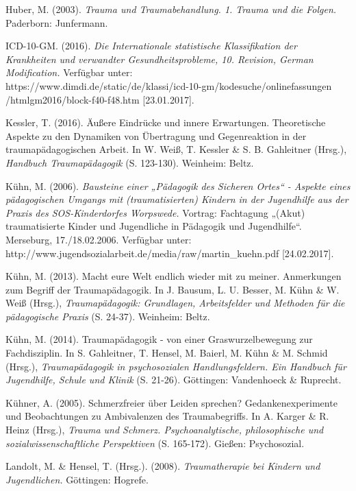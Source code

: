 \hang
Huber, M. (2003). \textit{Trauma und Traumabehandlung. 1. Trauma und die Folgen.} Paderborn: Junfermann.

\hang
ICD-10-GM. (2016). \textit{Die Internationale statistische Klassifikation der Krankheiten und verwandter Gesundheitsprobleme, 10. Revision, German Modification.} Verfügbar unter:\\ https://www.dimdi.de/static/de/klassi/icd-10-gm/kodesuche/onlinefassungen\\
/htmlgm2016/block-f40-f48.htm [23.01.2017].

\hang
Kessler, T. (2016). {\"A}ußere Eindr{\"u}cke und innere Erwartungen. Theoretische Aspekte zu den Dynamiken von {\"U}bertragung und Gegenreaktion in der traumap{\"a}dagogischen Arbeit. In W. Weiß, T. Kessler \& S. B. Gahleitner (Hrsg.), \textit{Handbuch Traumapädagogik} (S. 123-130). Weinheim: Beltz.

\hang
Kühn, M. (2006). \textit{Bausteine einer „P{\"a}dagogik des Sicheren Ortes“ - Aspekte eines p{\"a}dagogischen Umgangs mit (traumatisierten) Kindern in der Jugendhilfe aus der Praxis des SOS-Kinderdorfes Worpswede.} Vortrag: Fachtagung „(Akut) traumatisierte Kinder und Jugendliche in P{\"a}dagogik und Jugendhilfe“. Merseburg, 17./18.02.2006. Verfügbar unter:\\ http://www.jugendsozialarbeit.de/media/raw/martin\_kuehn.pdf [24.02.2017].

\hang
Kühn, M. (2013). Macht eure Welt endlich wieder mit zu meiner. Anmerkungen zum Begriff der Traumapädagogik. In J. Bausum, L. U. Besser, M. Kühn \& W. Weiß (Hrsg.), \textit{Traumapädagogik: Grundlagen, Arbeitsfelder und Methoden für die pädagogische Praxis} (S. 24-37). Weinheim: Beltz.

\hang
Kühn, M. (2014). Traumap{\"a}dagogik - von einer Graswurzelbewegung zur Fachdisziplin. In S. Gahleitner, T. Hensel, M. Baierl, M. K{\"u}hn \& M. Schmid (Hrsg.), \textit{Traumap{\"a}dagogik in psychosozialen Handlungsfeldern. Ein Handbuch f{\"u}r Jugendhilfe, Schule und Klinik} (S. 21-26). Göttingen: Vandenhoeck \& Ruprecht.

\hang
K{\"u}hner, A. (2005). Schmerzfreier {\"u}ber Leiden sprechen? Gedankenexperimente und Beobachtungen zu Ambivalenzen des Traumabegriffs. In A. Karger \& R. Heinz (Hrsg.), \textit{Trauma und Schmerz. Psychoanalytische, philosophische und sozialwissenschaftliche Perspektiven} (S. 165-172). Gießen: Psychosozial.

\hang
Landolt, M. \& Hensel, T. (Hrsg.). (2008). \textit{Traumatherapie bei Kindern und Jugendlichen.} Göttingen: Hogrefe.

